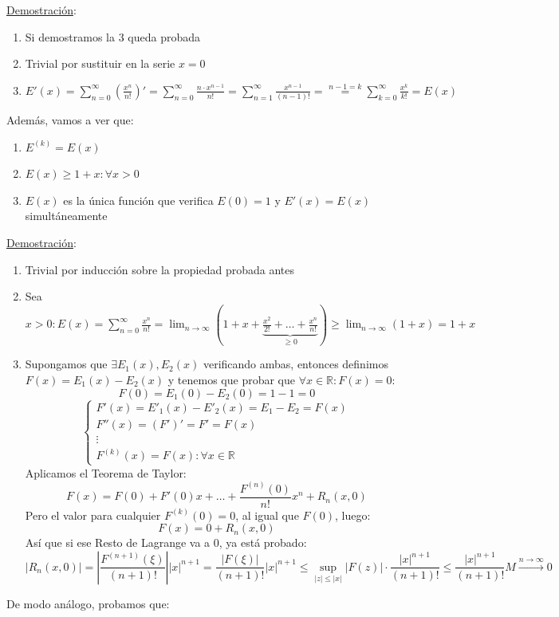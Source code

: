 \documentclass[10pt,a4paper,openright]{book}
\theoremstyle{break}
\begin{document}
\underline{Demostración}:
\begin{enumerate}
\item Si demostramos la 3 queda probada
\item Trivial por sustituir en la serie $x=0$
\item $E'(x) = \sum_{n=0}^{\infty} (\frac{x^n}{n!})' = \sum_{n=0}^{\infty} \frac{n \cdot x^{n-1}}{n!} = \sum_{n=1}^{\infty} \frac{ x^{n-1}}{(n-1)!} = \overset{n-1=k} = \sum_{k=0}^{\infty} \frac{x^k}{k!} = E(x)$
\end{enumerate}
Además, vamos a ver que:
\begin{enumerate}
\item $ E^{(k)} = E(x) $
\item $ E(x) \geq 1 + x : \forall x > 0 $
\item $E(x)$ es la única función que verifica $E(0)=1$ y $E'(x) = E(x)$ simultáneamente
\end{enumerate}
\underline{Demostración}:
\begin{enumerate}
\item Trivial por inducción sobre la propiedad probada antes
\item Sea $x > 0 : E(x) = \sum_{n=0}^{\infty} \frac{x^n}{n!} = \lim_{n \to \infty} ( 1 + x + \underbrace{\frac{x^2}{2!} + \ldots + \frac{x^n}{n!}}_{\geq 0}) \geq \lim_{n \to \infty} (1+x) = 1+ x$
\item Supongamos que $\exists E_1 (x),  E_2 (x)$ verificando ambas, entonces definimos $F(x) = E_1 (x) - E_2(x)$ y tenemos que probar que $\forall x \in \mathbb R : F(x) = 0$:
$$F(0) = E_1 (0) - E_2 (0) = 1 -1 = 0$$
$$\begin{cases} F'(x) = E'_1(x) - E'_2 (x) = E_1 - E_2 = F(x) \\
F''(x) = (F')' = F' = F(x) \\
\vdots \\
F^{(k)}(x) = F(x) : \forall x \in \mathbb{R} \end{cases}$$
Aplicamos el Teorema de Taylor:
$$F(x) = F(0) + F'(0)x + \ldots + \frac{F^{(n)} (0)}{n!} x^n + R_n (x,0)$$
Pero el valor para cualquier $F^{(k)}(0) = 0$, al igual que $F(0)$, luego:
$$F(x) = 0 +R_n (x,0)$$
Así que si ese Resto de Lagrange va a 0, ya está probado:
$$|R_n (x,0)| = \left| \frac{F^{(n+1)} (\xi)}{(n+1)!}\right| |x|^{n+1} = \frac{|F(\xi)|}{(n+1)!} |x|^{n+1} \leq \underset{|z| \leq |x|} {\sup} |F(z)| \cdot \frac{|x|^{n+1}}{(n+1)!} \leq \frac{|x|^{n+1}}{(n+1)!} M \overset{n \to \infty}{\longrightarrow} 0 $$
\end{enumerate}
De modo análogo, probamos que:
\end{document}

